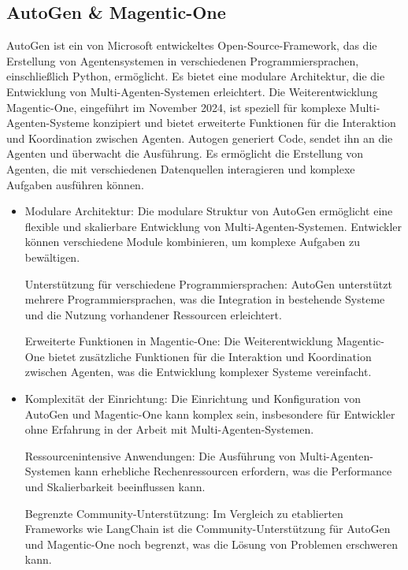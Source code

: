 \subsection{AutoGen \& Magentic-One}\cite{microsoft-autogen}

AutoGen ist ein von Microsoft entwickeltes Open-Source-Framework, das die Erstellung von Agentensystemen in verschiedenen Programmiersprachen, einschließlich Python, ermöglicht. Es bietet eine modulare Architektur, die die Entwicklung von Multi-Agenten-Systemen erleichtert. Die Weiterentwicklung Magentic-One, eingeführt im November 2024, ist speziell für komplexe Multi-Agenten-Systeme konzipiert und bietet erweiterte Funktionen für die Interaktion und Koordination zwischen Agenten.
Autogen generiert Code, sendet ihn an die Agenten und überwacht die Ausführung. Es ermöglicht die Erstellung von Agenten, die mit verschiedenen Datenquellen interagieren und komplexe Aufgaben ausführen können.

\begin{itemize}
    \item Modulare Architektur: Die modulare Struktur von AutoGen ermöglicht eine flexible und skalierbare Entwicklung von Multi-Agenten-Systemen. Entwickler können verschiedene Module kombinieren, um komplexe Aufgaben zu bewältigen.

    Unterstützung für verschiedene Programmiersprachen: AutoGen unterstützt mehrere Programmiersprachen, was die Integration in bestehende Systeme und die Nutzung vorhandener Ressourcen erleichtert.

    Erweiterte Funktionen in Magentic-One: Die Weiterentwicklung Magentic-One bietet zusätzliche Funktionen für die Interaktion und Koordination zwischen Agenten, was die Entwicklung komplexer Systeme vereinfacht.
\end{itemize}

\begin{itemize}
    \item Komplexität der Einrichtung: Die Einrichtung und Konfiguration von AutoGen und Magentic-One kann komplex sein, insbesondere für Entwickler ohne Erfahrung in der Arbeit mit Multi-Agenten-Systemen.

    Ressourcenintensive Anwendungen: Die Ausführung von Multi-Agenten-Systemen kann erhebliche Rechenressourcen erfordern, was die Performance und Skalierbarkeit beeinflussen kann.

    Begrenzte Community-Unterstützung: Im Vergleich zu etablierten Frameworks wie LangChain ist die Community-Unterstützung für AutoGen und Magentic-One noch begrenzt, was die Lösung von Problemen erschweren kann.
\end{itemize}

